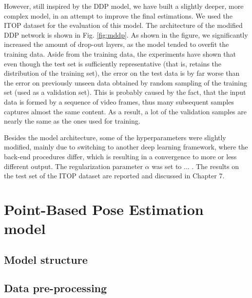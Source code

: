 \noindent
However, still inspired by the DDP model, we have built a slightly deeper, more complex model, in an attempt to improve the final estimations. We used the ITOP dataset for the evaluation of this model.
The architecture of the modified DDP network is shown in Fig. \ref{fig:mddp}. As shown in the figure, we significantly increased the amount of drop-out layers, as the model tended to overfit the training data. Aside from the training data, the experiments have shown that even though the test set is sufficiently representative (that is, retains the distribution of the training set), the error on the test data is by far worse than the error on previously unseen data obtained by random sampling of the training set (used as a validation set). This is probably caused by the fact, that the input data is formed by a sequence of video frames, thus many subsequent samples captures almost the same content. As a result, a lot of the validation samples are nearly the same as the ones used for training.\par
\vspace{5mm}
\noindent Besides the model architecture, some of the hyperparameters were slightly modified, mainly due to switching to another deep learning framework, where the back-end procedures differ, which is resulting in a convergence to more or less different output. The regularization parameter $\alpha$ was set to ... . 
The results on the test set of the ITOP dataset are reported and discussed in Chapter 7.



\section{Point-Based Pose Estimation model}


\subsection{Model structure}



\subsection{Data pre-processing}

